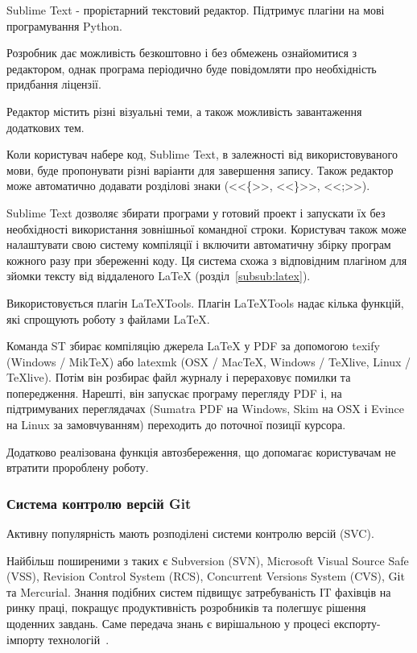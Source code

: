 Sublime Text - прорієтарний текстовий редактор. Підтримує плагіни на мові програмування Python.

Розробник дає можливість безкоштовно і без обмежень ознайомитися з редактором, однак програма періодично буде повідомляти про необхідність придбання ліцензії.

Редактор містить різні візуальні теми, а також можливість завантаження додаткових тем.

Коли користувач набере код, Sublime Text, в залежності від використовуваного мови, буде пропонувати різні варіанти для завершення запису. Також редактор може автоматично додавати розділові знаки (<<\{>>, <<\}>>, <<;>>).

Sublime Text дозволяє збирати програми у готовий проект і запускати їх без необхідності використання зовнішньої командної строки. Користувач також може налаштувати свою систему компіляції і включити автоматичну збірку програм кожного разу при збереженні коду. Ця система схожа з відповідним плагіном для зйомки тексту від віддаленого LaTeX (розділ~\ref{subsub:latex}).

Використовується плагін LaTeXTools. Плагін LaTeXTools надає кілька функцій, які спрощують роботу з файлами LaTeX.

Команда ST збирає компіляцію джерела LaTeX у PDF за допомогою texify (Windows / MikTeX) або latexmk (OSX / MacTeX, Windows / TeXlive, Linux / TeXlive). Потім він розбирає файл журналу і перераховує помилки та попередження. Нарешті, він запускає програму перегляду PDF і, на підтримуваних переглядачах (Sumatra PDF на Windows, Skim на OSX і Evince на Linux за замовчуванням) переходить до поточної позиції курсора.

Додатково реалізована функція автозбереження, що допомагає користувачам не втратити пророблену роботу.

\subsubsection{Система контролю версій Git}

Активну популярність мають розподілені системи контролю версій (SVC).

Найбільш поширеними з таких є Subversion (SVN), Microsoft Visual Source Safe (VSS), Revision Control System (RCS), Concurrent Versions System (CVS), Gіt та Mercurіal. Знання подібних систем підвищує затребуваність ІT фахівців на ринку праці, покращує продуктивність розробників та полегшує рішення щоденних завдань. Саме передача знань є вирішальною у процесі експорту-імпорту технологій~\cite{киричек2012модель}.

